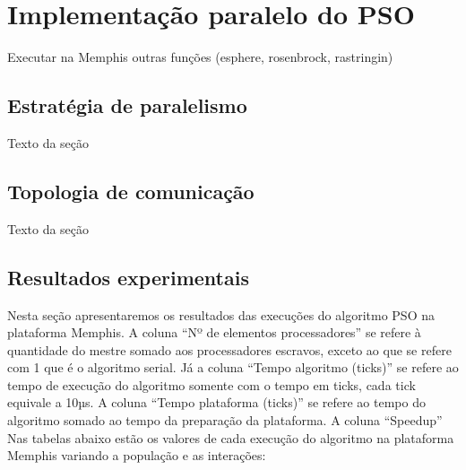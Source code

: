 \chapter{Implementação paralelo do PSO}

Executar na Memphis outras funções (esphere, rosenbrock, rastringin)

\section{Estratégia de paralelismo}

Texto da seção

\section{Topologia de comunicação}

Texto da seção

\section{Resultados experimentais}

Nesta seção apresentaremos os resultados das execuções do algoritmo PSO na plataforma Memphis.
A coluna “Nº de elementos processadores” se refere à quantidade do mestre somado aos processadores escravos, exceto ao que se refere com 1 que é o algoritmo serial. Já a coluna “Tempo algoritmo (ticks)” se refere ao tempo de execução do algoritmo somente com o tempo em ticks, cada tick equivale a 10µs. A coluna “Tempo plataforma (ticks)” se refere ao tempo do algoritmo somado ao tempo da preparação da plataforma. A coluna “Speedup”
Nas tabelas abaixo estão os valores de cada execução do algoritmo na plataforma Memphis variando a população e as interações:

